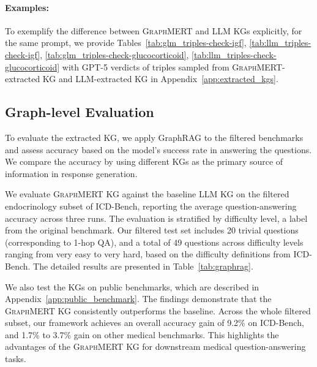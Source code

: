 \documentclass[10pt]{article}
\newcommand{\ours}{\textsc{GraphMERT}\xspace}
\begin{document}
\paragraph{Examples:}
To exemplify the difference between \ours and LLM KGs explicitly, for the same prompt, we provide 
Tables~\ref{tab:glm_triples-check-igf}, \ref{tab:llm_triples-check-igf}, \ref{tab:glm_triples-check-glucocorticoid}, \ref{tab:llm_triples-check-glucocorticoid} with GPT-5 verdicts of triples sampled from \ours-extracted KG and LLM-extracted KG in Appendix~\ref{app:extracted_kgs}. 

\subsection{Graph-level Evaluation}
\label{subsec:graph_rag_eval_result}

To evaluate the extracted KG, we apply GraphRAG to the filtered benchmarks and assess accuracy based on the model's success rate in answering the questions. We compare the accuracy by using different KGs as the primary source of information in response generation.

We evaluate \ours KG against the baseline LLM KG on the filtered endocrinology subset of ICD-Bench, reporting the average question-answering accuracy across three runs. The evaluation is stratified by difficulty level, a label from the original benchmark. Our filtered test set includes 20 trivial questions (corresponding to 1-hop QA), and a total of 49 questions across difficulty levels ranging from very easy to very hard, based on the difficulty definitions from ICD-Bench. The detailed results are presented in Table~\ref{tab:graphrag}.

We also test the KGs on public benchmarks, which are described in Appendix~\ref{app:public_benchmark}. The findings demonstrate that the \ours KG consistently outperforms the baseline. Across the whole filtered subset, our framework achieves an overall accuracy gain of 9.2\% on ICD-Bench, and 1.7\% to 3.7\% gain on other medical benchmarks. This highlights the advantages of the \ours KG for downstream medical question-answering tasks.
\end{document}
